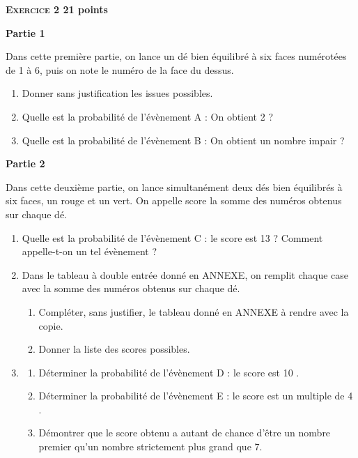 \documentclass[11pt]{article}
\begin{document}
\vspace{0,5cm}

\textbf{{\large \textsc{Exercice 2}} \hfill 21 points}

\textbf{Partie 1}
	
\medskip
Dans cette première partie, on lance un dé bien équilibré à six faces numérotées de 1 à 6, puis on note le numéro de la face du dessus.
	
	\begin{enumerate}
		\item Donner sans justification les issues possibles.
		
		\item Quelle est la probabilité de l'évènement A : \og On obtient 2 \fg{} ?
		
		\item Quelle est la probabilité de l'évènement B : \og On obtient un nombre impair \fg{} ?
	\end{enumerate}

	\textbf{Partie 2}

\medskip
	
Dans cette deuxième partie, on lance simultanément deux dés bien équilibrés à six faces, un rouge et un vert. On appelle \og score \fg{} la somme des numéros obtenus sur chaque dé.
	
	\begin{enumerate}
		\item Quelle est la probabilité de l'évènement C : \og le score est 13 \fg{} ? Comment appelle-t-on un tel évènement ?
		
		\item Dans le tableau à double entrée donné en ANNEXE, on remplit chaque case avec la somme des numéros obtenus sur chaque dé.
		
		\begin{enumerate}
			\item Compléter, sans justifier, le tableau donné en ANNEXE à rendre avec la copie.
			
			\item Donner la liste des scores possibles.
		\end{enumerate}
	
		\item \begin{enumerate}
			\item Déterminer la probabilité de l'évènement D : \og le score est 10 \fg.
			
			\item Déterminer la probabilité de l'évènement E : \og le score est un multiple de 4 \fg.
			
			\item Démontrer que le score obtenu a autant de chance d'être un nombre premier qu'un nombre strictement plus grand que 7.
		\end{enumerate}
	\end{enumerate}
\end{document}
